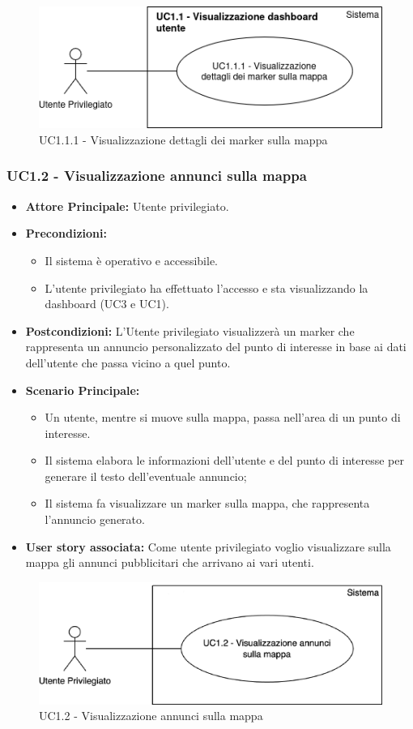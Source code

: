 \documentclass[11pt]{article}
\begin{document}
\begin{justify}
\begin{itemize}
\end{itemize}
\begin{figure}[H]
    \centering
    \includegraphics[width=0.5\linewidth]{UC1.1.1image.png}
    \caption{UC1.1.1 - Visualizzazione dettagli dei marker sulla mappa}
    \label{fig:UC1.1.1}
\end{figure}
\subsubsection{\textbf{UC1.2 - Visualizzazione annunci sulla mappa}}
\begin{itemize}
    \item \textbf{Attore Principale:} Utente privilegiato.
    \item \textbf{Precondizioni:} 
        \begin{itemize}
         \item Il sistema è operativo e accessibile.
    	\item L'utente privilegiato ha effettuato l'accesso e sta          visualizzando la dashboard (UC3 e UC1).
        \end{itemize}
    \item \textbf{Postcondizioni:} L'Utente privilegiato visualizzerà un marker che rappresenta un annuncio personalizzato del punto di interesse in base ai dati dell'utente che passa vicino a quel punto. 
    \item \textbf{Scenario Principale:} 
        \begin{itemize}
    	\item Un utente, mentre si muove sulla mappa, passa nell'area      di un punto di interesse.
    	\item Il sistema elabora le informazioni dell'utente e del         punto di interesse per generare il testo dell'eventuale            annuncio;
        \item Il sistema fa visualizzare un marker sulla mappa, che rappresenta l'annuncio generato.
	\end{itemize}
    \item \textbf{User story associata:} Come utente privilegiato voglio visualizzare sulla mappa gli annunci pubblicitari che arrivano ai vari utenti.
\end{itemize}
\begin{figure}[H]
    \centering
    \includegraphics[width=0.5\linewidth]{UC1.2image.png}
    \caption{UC1.2 - Visualizzazione annunci sulla mappa}
    \label{fig:UC1.2}
\end{figure}

\end{justify}
\end{document}
